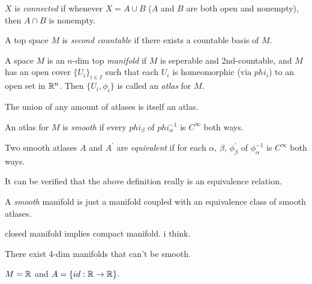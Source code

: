 \documentclass[11pt,leqno,oneside]{amsart}
\begin{document}
\begin{defn}
	$X$ is \emph{connected} if whenever $X = A \cup B$ ($A$ and $B$ are both open and nonempty), then $A \cap B$ is nonempty.
\end{defn}

\begin{defn}
	A top space $M$ is \emph{second countable} if there exists a countable basis of $M$.
\end{defn}

\begin{defn}
	A space $M$ is an $n$-dim top \emph{manifold} if $M$ is seperable and 2nd-countable, and $M$ has an open cover $\{U_i\}_{i \in I}$ such that each $U_i$ is homeomorphic (via $phi_i$) to an open set in ${\mathbb R}^n$.  Then $\{ U_i, \phi_i \}$ is called an \emph{atlas} for $M$.
\end{defn}
\begin{thm}
	The union of any amount of atlases is itself an atlas.
\end{thm}

\begin{defn}
	An atlas for $M$ is \emph{smooth} if every $phi_\beta$ of $phi_\alpha^{-1}$ is $C^\infty$ both ways.
\end{defn}

\begin{defn}
	Two smooth atlases $A$ and $A^\prime$ are \emph{equivalent} if for each $\alpha$, $\beta$, $\phi_\beta^\prime$ of $\phi_\alpha^{-1}$ is $C^\infty$ both ways.
\end{defn}
\begin{rmk}
	It can be verified that the above definition really is an equivalence relation.
\end{rmk}

\begin{defn}
	A \emph{smooth} manifold is just a manifold coupled with an equivalence class of smooth atlases.
\end{defn}

\begin{rmk}
	closed manifold implies compact manifold.  i think.
\end{rmk}

\begin{thm}
	There exist 4-dim manifolds that can't be smooth.
\end{thm}



\begin{example}
	$M = {\mathbb R}$ and $A = \{ id: {\mathbb R} \to {\mathbb R} \}$.
\end{example}
\end{document}
